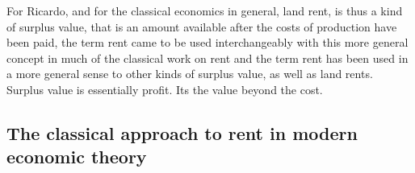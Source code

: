 
For Ricardo, and for the classical economics in general, land rent, is thus a kind of surplus value, that is an amount available after the costs of production have been paid, the term rent came to be used interchangeably with this more general concept in much of the classical work on rent and the term rent has been used in a more general sense to other kinds of surplus value, as well as land rents. 
Surplus value is essentially profit. Its the value beyond the cost. 
 








\subsection{The classical approach to rent in modern economic theory}

